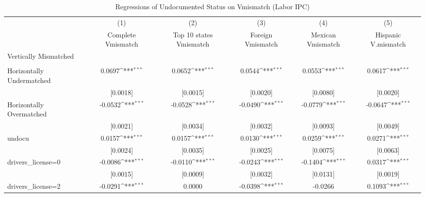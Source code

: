 \begin{table}[htbp]\centering
\def\sym#1{\ifmmode^{#1}\else\(^{#1}\)\fi}
\caption{Regressions of Undocumented Status on Vmismatch (Labor IPC)}
\begin{tabular}{l*{5}{c}}
\toprule
                    &\multicolumn{1}{c}{(1)}         &\multicolumn{1}{c}{(2)}         &\multicolumn{1}{c}{(3)}         &\multicolumn{1}{c}{(4)}         &\multicolumn{1}{c}{(5)}         \\
                    &Complete Vmismatch         &Top 10 states Vmismatch         &Foreign Vmismatch         &Mexican Vmismatch         &Hispanic V.mismatch         \\
\midrule
Vertically Mismatched&                     &                     &                     &                     &                     \\
                    &                     &                     &                     &                     &                     \\
\addlinespace
Horizontally Undermatched&      0.0697\sym{***}&      0.0652\sym{***}&      0.0544\sym{***}&      0.0553\sym{***}&      0.0617\sym{***}\\
                    &    [0.0018]         &    [0.0015]         &    [0.0020]         &    [0.0080]         &    [0.0020]         \\
\addlinespace
Horizontally Overmatched&     -0.0532\sym{***}&     -0.0528\sym{***}&     -0.0490\sym{***}&     -0.0779\sym{***}&     -0.0647\sym{***}\\
                    &    [0.0021]         &    [0.0034]         &    [0.0032]         &    [0.0093]         &    [0.0049]         \\
\addlinespace
undocu              &      0.0157\sym{***}&      0.0157\sym{***}&      0.0130\sym{***}&      0.0259\sym{***}&      0.0271\sym{***}\\
                    &    [0.0024]         &    [0.0035]         &    [0.0025]         &    [0.0075]         &    [0.0063]         \\
\addlinespace
drivers\_license=0   &     -0.0086\sym{***}&     -0.0110\sym{***}&     -0.0243\sym{***}&     -0.1404\sym{***}&      0.0317\sym{***}\\
                    &    [0.0015]         &    [0.0009]         &    [0.0032]         &    [0.0131]         &    [0.0019]         \\
\addlinespace
drivers\_license=2   &     -0.0291\sym{***}&      0.0000         &     -0.0398\sym{***}&     -0.0266         &      0.1093\sym{***}\\

\end{tabular}
\end{table}
